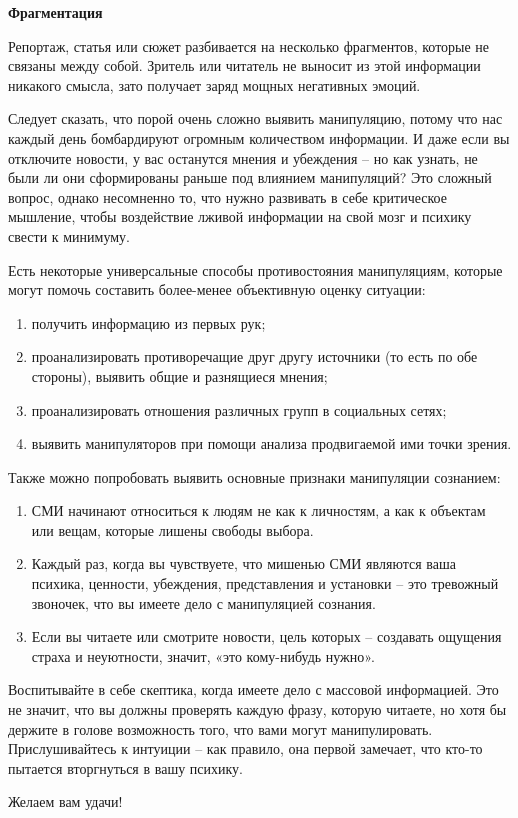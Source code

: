 \textbf{Фрагментация}

Репортаж, статья или сюжет разбивается на несколько фрагментов, которые не связаны между собой. Зритель или читатель не выносит из этой информации никакого смысла, зато получает заряд мощных негативных эмоций.

Следует сказать, что порой очень сложно выявить манипуляцию, потому что нас каждый день бомбардируют огромным количеством информации. И даже если вы отключите новости, у вас останутся мнения и убеждения – но как узнать, не были ли они сформированы раньше под влиянием манипуляций? Это сложный вопрос, однако несомненно то, что нужно развивать в себе критическое мышление, чтобы воздействие лживой информации на свой мозг и психику свести к минимуму.

Есть некоторые универсальные способы противостояния манипуляциям, которые могут помочь составить более-менее объективную оценку ситуации:
\begin{enumerate}
    \item получить информацию из первых рук;
    \item проанализировать противоречащие друг другу источники (то есть по обе стороны), выявить общие и разнящиеся мнения;
    \item проанализировать отношения различных групп в социальных сетях;
    \item выявить манипуляторов при помощи анализа продвигаемой ими точки зрения.
\end{enumerate}

Также можно попробовать выявить основные признаки манипуляции сознанием:
\begin{enumerate}
    \item СМИ начинают относиться к людям не как к личностям, а как к объектам или вещам, которые лишены свободы выбора.
    \item Каждый раз, когда вы чувствуете, что мишенью СМИ являются ваша психика, ценности, убеждения, представления и установки – это тревожный звоночек, что вы имеете дело с манипуляцией сознания.
    \item Если вы читаете или смотрите новости, цель которых – создавать ощущения страха и неуютности, значит, «это кому-нибудь нужно».
\end{enumerate}

Воспитывайте в себе скептика, когда имеете дело с массовой информацией. Это не значит, что вы должны проверять каждую фразу, которую читаете, но хотя бы держите в голове возможность того, что вами могут манипулировать. Прислушивайтесь к интуиции – как правило, она первой замечает, что кто-то пытается вторгнуться в вашу психику.

Желаем вам удачи!
